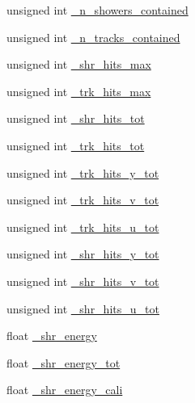 \begin{DoxyCompactItemize}
\item 
unsigned int \hyperlink{classselection_1_1CC0piNpSelection_aebf4a69b8d7f3171ad90c382668c22ec}{\-\_\-n\-\_\-showers\-\_\-contained}
\item 
unsigned int \hyperlink{classselection_1_1CC0piNpSelection_a22c5cd4cf8882fa3cbabf25ed86d1f39}{\-\_\-n\-\_\-tracks\-\_\-contained}
\item 
unsigned int \hyperlink{classselection_1_1CC0piNpSelection_a750834ef52299d85f9596bbbafa1dffb}{\-\_\-shr\-\_\-hits\-\_\-max}
\item 
unsigned int \hyperlink{classselection_1_1CC0piNpSelection_a247d186cb641d28f8ea5b02c4f2a39bc}{\-\_\-trk\-\_\-hits\-\_\-max}
\item 
unsigned int \hyperlink{classselection_1_1CC0piNpSelection_aa6e7162371e3e343df001f0afc8a20b8}{\-\_\-shr\-\_\-hits\-\_\-tot}
\item 
unsigned int \hyperlink{classselection_1_1CC0piNpSelection_a420b9962478d7998282e03f1ccf89c2e}{\-\_\-trk\-\_\-hits\-\_\-tot}
\item 
unsigned int \hyperlink{classselection_1_1CC0piNpSelection_a76eb07fcb9190709464880c0ea7c4eba}{\-\_\-trk\-\_\-hits\-\_\-y\-\_\-tot}
\item 
unsigned int \hyperlink{classselection_1_1CC0piNpSelection_a30fe5ccb6a299f7955125aa6c9d5923d}{\-\_\-trk\-\_\-hits\-\_\-v\-\_\-tot}
\item 
unsigned int \hyperlink{classselection_1_1CC0piNpSelection_af7d0e867df8901ff3e531b4c1b96408a}{\-\_\-trk\-\_\-hits\-\_\-u\-\_\-tot}
\item 
unsigned int \hyperlink{classselection_1_1CC0piNpSelection_a6a43c3523af47860ad1682ebe14bb8e3}{\-\_\-shr\-\_\-hits\-\_\-y\-\_\-tot}
\item 
unsigned int \hyperlink{classselection_1_1CC0piNpSelection_ab6aaf4282fa9d2e5971e162c66901227}{\-\_\-shr\-\_\-hits\-\_\-v\-\_\-tot}
\item 
unsigned int \hyperlink{classselection_1_1CC0piNpSelection_afba4a31f84c2f125323b90f007bda1c6}{\-\_\-shr\-\_\-hits\-\_\-u\-\_\-tot}
\item 
float \hyperlink{classselection_1_1CC0piNpSelection_abf854f061d0476dc08ae8b3d71e7a86d}{\-\_\-shr\-\_\-energy}
\item 
float \hyperlink{classselection_1_1CC0piNpSelection_a6e42f011e79f646f36df7148907d1b59}{\-\_\-shr\-\_\-energy\-\_\-tot}
\item 
float \hyperlink{classselection_1_1CC0piNpSelection_a910f18dc66ac2f22aa8cbdd6b86c7d0e}{\-\_\-shr\-\_\-energy\-\_\-cali}
\item 

\end{DoxyCompactItemize}
